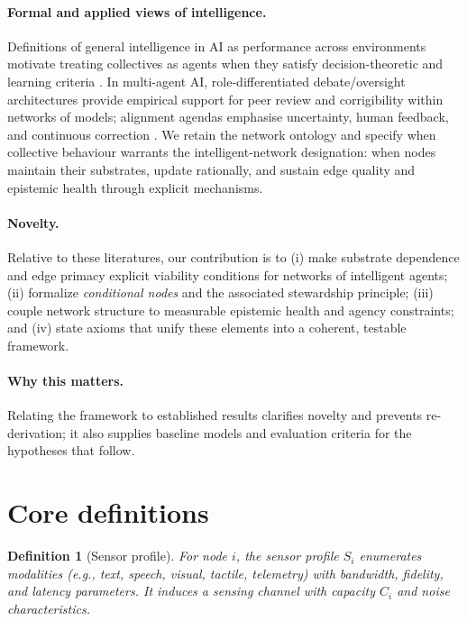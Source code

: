 \documentclass[12pt]{article}
\newtheorem{definition}{Definition}
\begin{document}
\paragraph{Formal and applied views of intelligence.}
Definitions of general intelligence in AI as performance across environments motivate treating collectives as agents when they satisfy decision-theoretic and learning criteria \citep{LeggHutter2007}. In multi-agent AI, role-differentiated debate/oversight architectures provide empirical support for peer review and corrigibility within networks of models; alignment agendas emphasise uncertainty, human feedback, and continuous correction \citep{Amodei2016,Russell2019}. We retain the network ontology and specify when collective behaviour warrants the intelligent-network designation: when nodes maintain their substrates, update rationally, and sustain edge quality and epistemic health through explicit mechanisms.

\paragraph{Novelty.}
Relative to these literatures, our contribution is to (i) make substrate dependence and edge primacy explicit viability conditions for networks of intelligent agents; (ii) formalize \emph{conditional nodes} and the associated stewardship principle; (iii) couple network structure to measurable epistemic health and agency constraints; and (iv) state axioms that unify these elements into a coherent, testable framework.

\paragraph{Why this matters.} Relating the framework to established results clarifies novelty and prevents re-derivation; it also supplies baseline models and evaluation criteria for the hypotheses that follow.
\section{Core definitions}
\begin{definition}[Sensor profile]\label{def:sensors}
For node $i$, the \emph{sensor profile} $S_i$ enumerates modalities (e.g., text, speech, visual, tactile, telemetry) with bandwidth, fidelity, and latency parameters. It induces a sensing channel with capacity $C_i$ and noise characteristics.
\end{definition}
\end{document}
